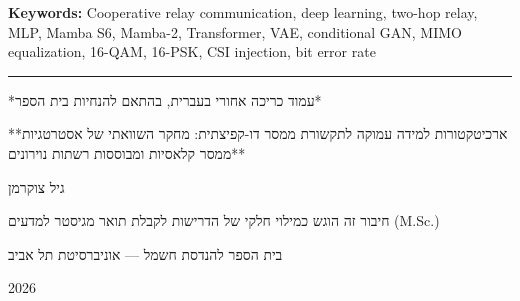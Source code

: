 \documentclass[
  english,
  12pt,
  12pt,
  a4paper,
  oneside]{report}
\begin{document}
\textbf{Keywords:} Cooperative relay communication, deep learning, two-hop relay, MLP, Mamba S6, Mamba-2, Transformer, VAE, conditional GAN, MIMO equalization, 16-QAM, 16-PSK, CSI injection, bit error rate

\begin{center}\rule{0.5\linewidth}{0.5pt}\end{center}

\begin{flushright}
\begin{otherlanguage}{hebrew}
*עמוד כריכה אחורי בעברית, בהתאם להנחיות בית הספר*

**ארכיטקטורות למידה עמוקה לתקשורת ממסר דו-קפיצתית: מחקר השוואתי של אסטרטגיות ממסר קלאסיות ומבוססות רשתות נוירונים**

גיל צוקרמן

חיבור זה הוגש כמילוי חלקי של הדרישות לקבלת תואר מגיסטר למדעים (M.Sc.)

בית הספר להנדסת חשמל — אוניברסיטת תל אביב

2026
\end{otherlanguage}
\end{flushright}
\end{document}
